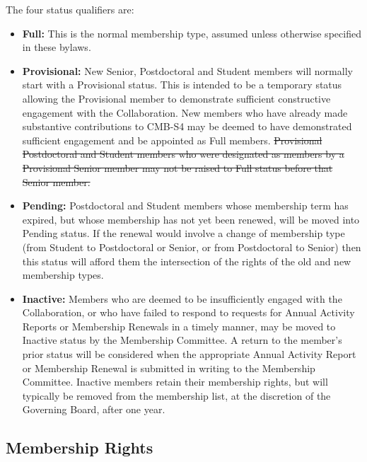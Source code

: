 \documentclass[12pt]{article}
\begin{document}
{\begin{itemize}
\end{itemize}

\noindent
The four status qualifiers are:

\begin{itemize}

\item {\bf Full:}
This is the normal membership type, assumed unless otherwise specified in these bylaws.

\item {\bf Provisional:} 
New Senior, Postdoctoral and Student members will normally start with a Provisional status. This is intended to be a temporary status allowing the Provisional member to demonstrate sufficient constructive engagement with the Collaboration. New members who have already made substantive contributions to CMB-S4 may be deemed to have demonstrated sufficient engagement and be appointed as Full members. \sout{Provisional Postdoctoral and Student members who were designated as members by a Provisional Senior member may not be raised to Full status before that Senior member.}

\item {\bf Pending:} 
Postdoctoral and Student members whose membership term has expired, but whose membership has not yet been renewed, will be moved into Pending status. If the renewal would involve a change of membership type (from Student to Postdoctoral or Senior, or from Postdoctoral to Senior) then this status will afford them the intersection of the rights of the old and new membership types.

\item {\bf Inactive:}
Members who are deemed to be insufficiently engaged with the Collaboration, or who have failed to respond to requests for Annual Activity Reports or Membership Renewals in a timely manner, may be moved to Inactive status by the Membership Committee. A return to the member's prior status will be considered when the appropriate Annual Activity Report or Membership Renewal is submitted in writing to the Membership Committee. Inactive members retain their membership rights, but will typically be removed from the membership list, at the discretion of the Governing Board, after one year.

\end{itemize}

\subsection{Membership Rights}\label{sec:memberrights}

}
\end{document}
